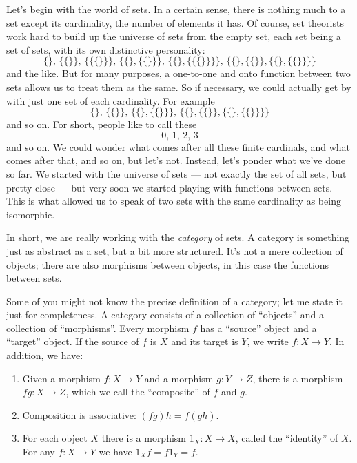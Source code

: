 \documentclass{article}
\begin{document}
Let's begin with the world of sets. In a certain sense, there is nothing
much to a set except its cardinality, the number of elements it has. Of
course, set theorists work hard to build up the universe of sets from
the empty set, each set being a set of sets, with its own distinctive
personality:
\[\{\} ,\, \{\{\}\} ,\, \{\{\{\}\}\} ,\, \{\{\},\{\{\}\}\} ,\, \{\{\},\{\{\{\}\}\}\} ,\, \{\{\},\{\{\}\},\{\{\},\{\{\}\}\}\}\]
and the like. But for many purposes, a one-to-one and onto function
between two sets allows us to treat them as the same. So if necessary,
we could actually get by with just one set of each cardinality. For
example
\[\{\} ,\, \{\{\}\} ,\, \{\{\},\{\{\}\}\} ,\, \{\{\},\{\{\}\},\{\{\},\{\{\}\}\}\}\]
and so on. For short, people like to call these \[0 ,\, 1 ,\, 2 ,\, 3\]
and so on. We could wonder what comes after all these finite cardinals,
and what comes after that, and so on, but let's not. Instead, let's
ponder what we've done so far. We started with the universe of sets ---
not exactly the set of all sets, but pretty close --- but very soon we
started playing with functions between sets. This is what allowed us to
speak of two sets with the same cardinality as being isomorphic.

In short, we are really working with the \emph{category} of sets. A
category is something just as abstract as a set, but a bit more
structured. It's not a mere collection of objects; there are also
morphisms between objects, in this case the functions between sets.

Some of you might not know the precise definition of a category; let me
state it just for completeness. A category consists of a collection of
``objects'' and a collection of ``morphisms''. Every morphism \(f\) has
a ``source'' object and a ``target'' object. If the source of \(f\) is
\(X\) and its target is \(Y\), we write \(f\colon X \to Y\). In
addition, we have:

\begin{enumerate}
\def\labelenumi{\arabic{enumi})}
\item
  Given a morphism \(f\colon X \to Y\) and a morphism
  \(g\colon Y \to Z\), there is a morphism \(fg\colon X \to Z\), which
  we call the ``composite'' of \(f\) and \(g\).
\item
  Composition is associative: \((fg)h = f(gh)\).
\item
  For each object \(X\) there is a morphism \(1_X\colon X \to X\),
  called the ``identity'' of \(X\). For any \(f\colon X \to Y\) we have
  \(1_X f = f 1_Y = f\).
\end{enumerate}
\end{document}
